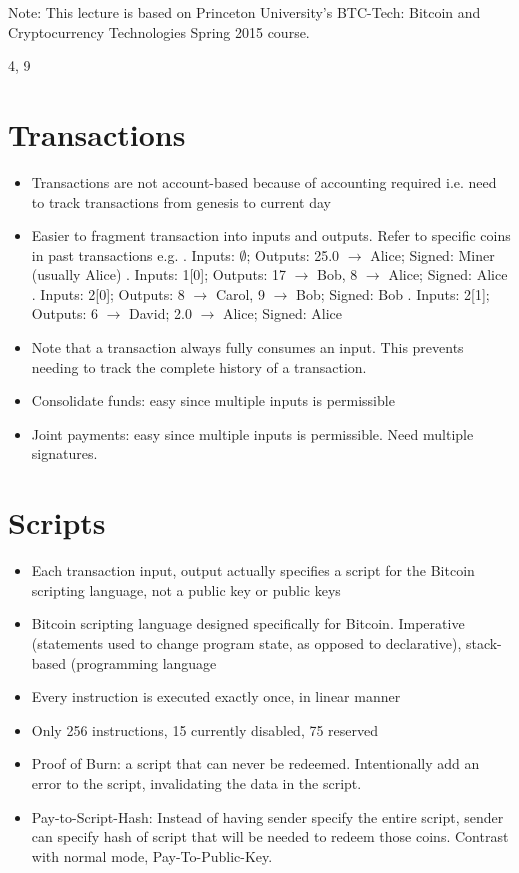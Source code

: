\documentclass{article}
\begin{document}
\maketitle

Note: This lecture is based on Princeton University's BTC-Tech: Bitcoin and Cryptocurrency Technologies Spring 2015 course.

4, 9

\section*{Transactions}
\begin{itemize}
\item Transactions are not account-based because of accounting required i.e. need to track transactions from genesis to current day
\item Easier to fragment transaction into inputs and outputs. Refer to specific coins in past transactions e.g.
. Inputs: $\emptyset$; Outputs: 25.0 $\rightarrow$ Alice; Signed: Miner (usually Alice)
. Inputs: 1[0]; Outputs: 17 $\rightarrow$ Bob, 8 $\rightarrow$ Alice; Signed: Alice
. Inputs: 2[0]; Outputs: 8 $\rightarrow$ Carol, 9 $\rightarrow$ Bob; Signed: Bob
. Inputs: 2[1]; Outputs: 6 $\rightarrow$ David; 2.0 $\rightarrow$ Alice; Signed: Alice
\item Note that a transaction always fully consumes an input. This prevents needing to track the complete history of a transaction.
\item Consolidate funds: easy since multiple inputs is permissible
\item Joint payments: easy since multiple inputs is permissible. Need multiple signatures.
\end{itemize}

\section*{Scripts}
\begin{itemize}
\item Each transaction input, output actually specifies a script for the Bitcoin scripting language, not a public key or public keys
\item Bitcoin scripting language designed specifically for Bitcoin. Imperative (statements used to change program state, as opposed to declarative), stack-based (programming language
\item Every instruction is executed exactly once, in linear manner
\item Only 256 instructions, 15 currently disabled, 75 reserved
\item Proof of Burn: a script that can never be redeemed. Intentionally add an error to the script, invalidating the data in the script.
\item Pay-to-Script-Hash: Instead of having sender specify the entire script, sender can specify hash of script that will be needed to redeem those coins. Contrast with normal mode, Pay-To-Public-Key.
\end{itemize}
\end{document}
